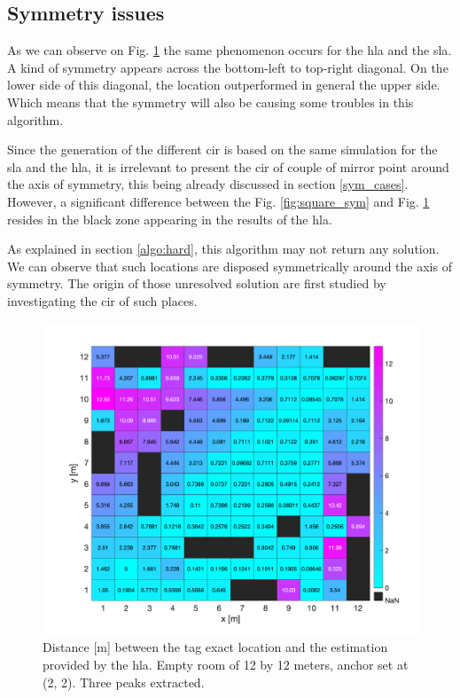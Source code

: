 \subsection{Symmetry issues}

As we can observe on Fig. \ref{fig:sym_hard} the same phenomenon occurs for the \gls{hla} and the \gls{sla}. A kind of symmetry appears across the bottom-left to top-right diagonal. On the lower side of this diagonal, the location outperformed in general the upper side. Which means that the symmetry will also be causing some troubles in this algorithm.
\vspace{2mm}

Since the generation of the different \gls{cir} is based on the same simulation for the \gls{sla} and the \gls{hla}, it is irrelevant to present the \gls{cir} of couple of mirror point around the axis of symmetry, this being already discussed in section \ref{sym_cases}. However, a significant difference between the Fig. \ref{fig:square_sym} and Fig. \ref{fig:sym_hard} resides in the black zone appearing in the results of the \gls{hla}.
\vspace{2mm}

As explained in section \ref{algo:hard}, this algorithm may not return any solution. We can observe that such locations are disposed symmetrically around the axis of symmetry. The origin of those unresolved solution are first studied by investigating the \gls{cir} of such places. 

\begin{figure}[H]
\centering
\includegraphics[width=.8\linewidth]{Images/hla_images/hla_anchor_(2_2)_empty.png}
\caption{Distance [m] between the tag exact location and the estimation provided by the \gls{hla}. Empty room of 12 by 12 meters, anchor set at (2, 2). Three peaks extracted. \label{fig:sym_hard}}
\end{figure}

